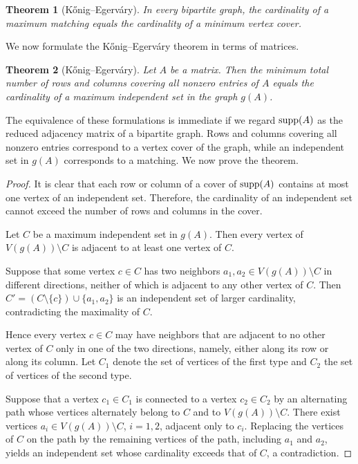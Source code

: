 \documentclass[11pt]{article}
\newtheorem{theorem}{Theorem}[section]
\theoremstyle{definition}
\newcommand{\supp}{{\rm supp}}
\begin{document}
{{{\begin{theorem}[Kőnig--Egerváry]
In every bipartite graph, the cardinality of a maximum matching equals
the cardinality of a minimum vertex cover.
\end{theorem}

We now formulate the Kőnig--Egerváry theorem in terms of matrices.

\begin{theorem}[Kőnig--Egerváry]
Let $A$ be a matrix.
Then the minimum total number of rows and columns covering all nonzero
entries of $A$ equals the cardinality of a maximum independent set in
the graph $g(A)$.
\end{theorem}

The equivalence of these formulations is immediate if we regard
$\supp(A)$ as the reduced adjacency matrix of a bipartite graph.
Rows and columns covering all nonzero entries correspond to a vertex
cover of the graph, while an independent set in $g(A)$ corresponds to
a matching.
We now prove the theorem.

\begin{proof}
It is clear that each row or column of a cover of $\supp(A)$ contains
at most one vertex of an independent set.
Therefore, the cardinality of an independent set cannot exceed the
number of rows and columns in the cover.

Let $C$ be a maximum independent set in $g(A)$.
Then every vertex of $V(g(A))\setminus C$ is adjacent to at least one
vertex of $C$.

Suppose that some vertex $c\in C$ has two neighbors
$a_1,a_2\in V(g(A))\setminus C$ in different directions, neither of
which is adjacent to any other vertex of $C$.
Then
$C'=(C\setminus\{c\})\cup\{a_1,a_2\}$
is an independent set of larger cardinality, contradicting the
maximality of $C$.

Hence every vertex $c\in C$ may have neighbors that are adjacent to no
other vertex of $C$ only in one of the two directions, namely, either
along its row or along its column.
Let $C_1$ denote the set of vertices of the first type and $C_2$ the
set of vertices of the second type.

Suppose that a vertex $c_1\in C_1$ is connected to a vertex
$c_2\in C_2$ by an alternating path whose vertices alternately belong
to $C$ and to $V(g(A))\setminus C$.
There exist vertices
$a_i\in V(g(A))\setminus C$, $i=1,2$, adjacent only to $c_i$.
Replacing the vertices of $C$ on the path by the remaining vertices of
the path, including $a_1$ and $a_2$, yields an independent set whose
cardinality exceeds that of $C$, a contradiction.


\end{proof}}}}
\end{document}

